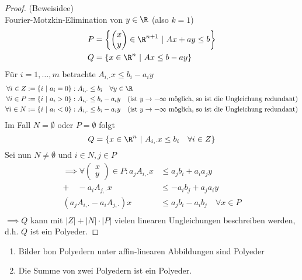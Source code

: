 \begin{proof}
	(Beweisidee)\\
	Fourier-Motzkin-Elimination von $y \in \R$ (also $k=1$)
	\begin{align*}
		P &= \left\{ 
			\begin{pmatrix}
				x\\y
			\end{pmatrix}
			\in \R^{n+1}\ |\ Ax + ay \leq b
			\right\}\\
		Q &= \left\{ x \in \R^{n}\ |\ Ax  \leq b - ay \right\}
	\end{align*}
	Für $i=1,\dots ,m$ betrachte $A_{i,\cdot}x \leq b_{i} -a_{i}y$
	\begin{align*}
		\forall i \in Z := \left\{ i \ |\ a_{i} = 0 \right\} &: A_{i,\cdot} \leq b_{i} \quad \forall y \in \R\\
		\forall i \in P := \left\{ i \ |\ a_{i} > 0 \right\} &: A_{i,\cdot} \leq b_{i} - a_{i}y \quad(\text{ist $y\to - \infty$ möglich, so ist die Ungleichung redundant})\\
		\forall i \in N := \left\{ i \ |\ a_{i} < 0 \right\} &: A_{i,\cdot} \leq b_{i} - a_{i}y \quad(\text{ist $y\to - \infty$ möglich, so ist die Ungleichung redundant})\\
	\end{align*}
	Im Fall $N=\emptyset$ oder $P = \emptyset$ folgt 
	\begin{equation*}
		Q = \left\{ x \in \R^n\ |\ A_{i,\cdot} x \leq b_{i} \quad \forall i \in Z \right\}
	\end{equation*}
	Sei nun $N \neq \emptyset$ und $i \in N, j \in P$ 
	\begin{align*}
		\implies \forall 
		\begin{pmatrix}
			x\\y
		\end{pmatrix}
		\in P : a_{j}A_{i,\cdot}x &\leq a_{j}b_{i} + a_{i}a_{j}y\\
		 + \quad -a_{i}A_{j,\cdot}x &\leq -a_{i}b_{j} + a_{j}a_{i}y\\ \hline
		 (a_{j}A_{i,\cdot}-a_{i}A_{j,\cdot})x &\leq a_{j}b_{i} - a_{i}b_{j} \quad \forall x \in P\\
	\end{align*}
	$\implies Q$ kann mit $|Z| + |N|\cdot |P|$ vielen linearen Ungleichungen beschreiben werden, d.h. $Q$ ist ein Polyeder.
\end{proof}
\begin{lemma}
	\begin{enumerate}[label = (\alph*)]
		\item Bilder bon Polyedern unter affin-linearen Abbildungen sind Polyeder
		\item Die Summe von zwei Polyedern ist ein Polyeder.
	\end{enumerate}
\end{lemma}
